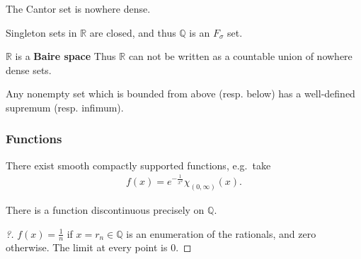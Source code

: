\begin{corollary}[?]

The Cantor set is nowhere dense.

\end{corollary}

\begin{proposition}[?]

Singleton sets in \({\mathbb{R}}\) are closed, and thus \({\mathbb{Q}}\)
is an \(F_\sigma\) set.

\end{proposition}

\begin{theorem}[Baire]

\({\mathbb{R}}\) is a \textbf{Baire space} Thus \({\mathbb{R}}\) can not
be written as a countable union of nowhere dense sets.

\end{theorem}

\begin{lemma}[?]

Any nonempty set which is bounded from above (resp. below) has a
well-defined supremum (resp. infimum).

\end{lemma}

\hypertarget{functions}{%
\subsubsection{Functions}\label{functions}}

\begin{proposition}

There exist smooth compactly supported functions, e.g.~take
\begin{align*}
f(x) = e^{-\frac{1}{x^2}} \chi_{(0, \infty)}(x)
.\end{align*}

\end{proposition}

\begin{lemma}

There is a function discontinuous precisely on \({\mathbb{Q}}\).

\end{lemma}

\begin{proof}[?]

\(f(x) = \frac 1 n\) if \(x = r_n \in {\mathbb{Q}}\) is an enumeration
of the rationals, and zero otherwise. The limit at every point is 0.

\end{proof}

